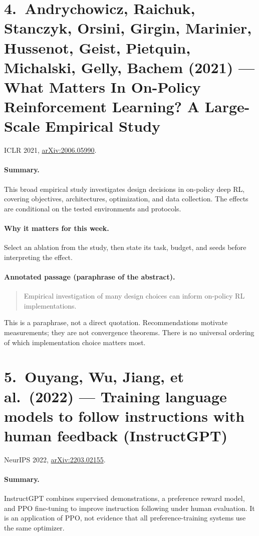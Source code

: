 \documentclass[11pt]{scrartcl}
\begin{document}
\section*{4.\ Andrychowicz, Raichuk, Stanczyk, Orsini, Girgin, Marinier, Hussenot, Geist, Pietquin, Michalski, Gelly, Bachem (2021) --- What Matters In On-Policy Reinforcement Learning? A Large-Scale Empirical Study}
ICLR 2021, \href{https://arxiv.org/abs/2006.05990}{arXiv:2006.05990}.

\paragraph{Summary.} This broad empirical study investigates design decisions in on-policy deep RL, covering objectives, architectures, optimization, and data collection. The effects are conditional on the tested environments and protocols.
\paragraph{Why it matters for this week.} Select an ablation from the study, then state its task, budget, and seeds before interpreting the effect.
\paragraph{Annotated passage (paraphrase of the abstract).}
\begin{quote}Empirical investigation of many design choices can inform on-policy RL implementations.\end{quote}
This is a paraphrase, not a direct quotation. Recommendations motivate measurements; they are not convergence theorems. There is no universal ordering of which implementation choice matters most.


\section*{5.\ Ouyang, Wu, Jiang, et al.\ (2022) --- Training language models to follow instructions with human feedback (InstructGPT)}
NeurIPS 2022, \href{https://arxiv.org/abs/2203.02155}{arXiv:2203.02155}.

\paragraph{Summary.} InstructGPT combines supervised demonstrations, a preference reward model, and PPO fine-tuning to improve instruction following under human evaluation. It is an application of PPO, not evidence that all preference-training systems use the same optimizer.
\end{document}
